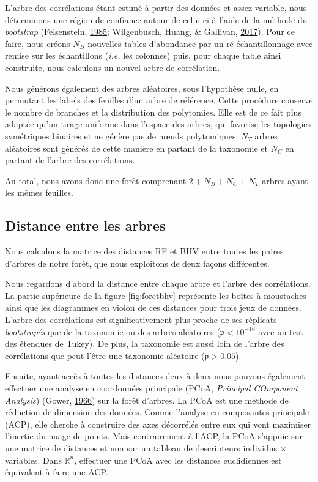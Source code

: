 \documentclass[12pt,a4paper]{reedthesis}
\newcommand \RR {\mathbb{R}}
\newcommand \pv {\mathfrak{p}}
\theoremstyle{definition}
\theoremstyle{definition}
\theoremstyle{definition}
\theoremstyle{remark}
\begin{document}
L'arbre des corrélations étant estimé à partir des données et assez variable, nous déterminons une région de confiance autour de celui-ci à l'aide de la méthode du \emph{bootstrap} (Felsenstein, \protect\hyperlink{ref-felsenstein1985confidence}{1985}; Wilgenbusch, Huang, \& Gallivan, \protect\hyperlink{ref-wilgenbusch2017visualizing}{2017}). Pour ce faire, nous créons \(N_B\) nouvelles tables d'abondance par un ré-échantillonnage avec remise sur les échantillons (\emph{i.e.} les colonnes) puis, pour chaque table ainsi construite, nous calculons un nouvel arbre de corrélation.

Nous générons également des arbres aléatoires, sous l'hypothèse nulle, en permutant les labels des feuilles d'un arbre de référence. Cette procédure conserve le nombre de branches et la distribution des polytomies. Elle est de ce fait plus adaptée qu'un tirage uniforme dans l'espace des arbres, qui favorise les topologies symétriques binaires et ne génère pas de nœuds polytomiques. \(N_T\) arbres aléatoires sont générés de cette manière en partant de la taxonomie et \(N_C\) en partant de l'arbre des corrélations.

Au total, nous avons donc une forêt comprenant \(2 + N_B + N_C + N_T\) arbres ayant les mêmes feuilles.

\hypertarget{distance-entre-les-arbres}{%
\subsection{Distance entre les arbres}\label{distance-entre-les-arbres}}

Nous calculons la matrice des distances RF et BHV entre toutes les paires d'arbres de notre forêt, que nous exploitons de deux façons différentes.

Nous regardons d'abord la distance entre chaque arbre et l'arbre des corrélations. La partie supérieure de la figure \ref{fig:foretbhv} représente les boîtes à moustaches ainsi que les diagrammes en violon de ces distances pour trois jeux de données. L'arbre des corrélations est significativement plus proche de ses réplicats \emph{bootstrapés} que de la taxonomie ou des arbres aléatoires (\(\pv<10^{-16}\) avec un test des étendues de Tukey). De plus, la taxonomie est aussi loin de l'arbre des corrélations que peut l'être une taxonomie aléatoire (\(\pv > 0.05\)).

Ensuite, ayant accès à toutes les distances deux à deux nous pouvons également effectuer une analyse en coordonnées principale (PCoA, \emph{Principal COmponent Analysis}) (Gower, \protect\hyperlink{ref-gower1966some}{1966}) sur la forêt d'arbres. La PCoA est une méthode de réduction de dimension des données. Comme l'analyse en composantes principale (ACP), elle cherche à construire des axes décorrélés entre eux qui vont maximiser l'inertie du nuage de points. Mais contrairement à l'ACP, la PCoA s'appuie sur une matrice de distances et non sur un tableau de descripteurs individus \(\times\) variables. Dans \(\RR^n\), effectuer une PCoA avec les distances euclidiennes est équivalent à faire une ACP.
\end{document}
